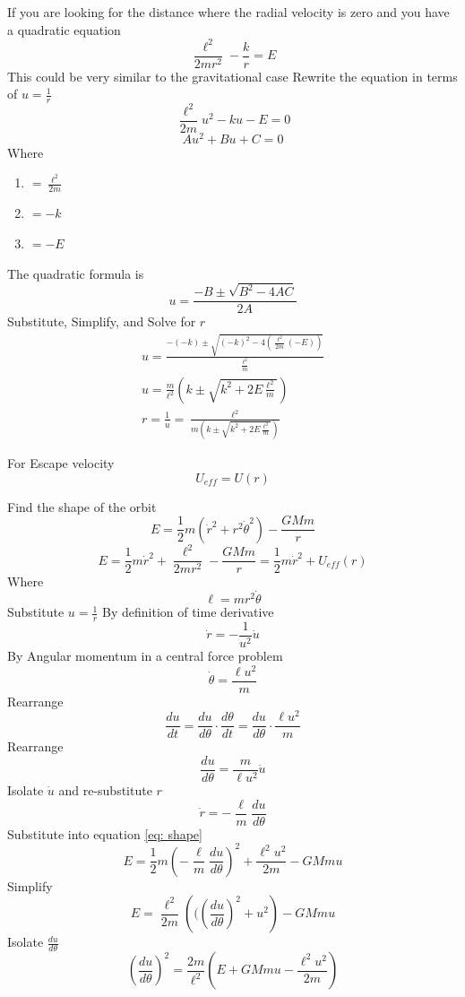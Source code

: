 \documentclass[12pt]{article}
\begin{document}
    If you are looking for the distance where the radial velocity is zero and you have a quadratic equation
    \[
        \frac{\ell^2}{2 m r^2} - \frac{k}{r} = E
    \]
    This could be very similar to the gravitational case
    Rewrite the equation in terms of $u = \frac{1}{r}$
    \[
        \frac{\ell^2}{2 m} u^2 - k u - E = 0
    \]
    \[
        Au^2 + Bu + C = 0
    \]
    Where
    \begin{enumerate}
        \item [A] $= \frac{\ell^2}{2m}$
        \item [B] $= - k$
        \item [C] $= -E$
    \end{enumerate}
    The quadratic formula is 
    \[
        u = \frac{- B \pm \sqrt{B^2 - 4 A C}}{2 A}
    \]
    Substitute, Simplify, and Solve for $r$
    \begin{gather*}
        u = \frac{- (-k) \pm \sqrt{(-k)^2 - 4 \left(\frac{\ell^2}{2 m} (-E) \right)}}{\frac{\ell^2}{m}}
        \\ u = \frac{m}{\ell^2} \left(k \pm \sqrt{k^2 + 2 E \frac{\ell^2}{m}} \right)
        \\ r = \frac{1}{u} = \frac{\ell^2}{m \left(k \pm \sqrt{k^2 + 2 E \frac{\ell^2}{m}} \right)}
    \end{gather*}

    For Escape velocity 
    \[
        U_{eff} = U(r)
    \]

    Find the shape of the orbit
    \[
        E = \frac{1}{2}m (\dot{r}^2 + r^2 \dot{\theta}^2) - \frac{G M m}{r}
    \]
    \begin{equation} \label{eq: shape}
        E = \frac{1}{2}m \dot{r}^2 + \frac{\ell^2}{2 m r^2} - \frac{G M m}{r} = \frac{1}{2}m \dot{r}^2 + U_{eff}(r)
    \end{equation}
    Where 
    \[
        \ell = m r^2 \dot{\theta}
    \]
    Substitute $u = \frac{1}{r}$
    By definition of time derivative
    \[
        \dot{r} = -\frac{1}{u^2} \dot{u}
    \]
    By Angular momentum in a central force problem
    \[
        \dot{\theta} = \frac{\ell u^2}{m}
    \]
    Rearrange
    \[
        \frac{du}{dt} = \frac{du}{d\theta} \cdot \frac{d\theta}{dt} = \frac{du}{d\theta} \cdot \frac{\ell u^2}{m}
    \]
    Rearrange
    \[
        \frac{du}{d\theta} = \frac{m}{\ell u^2} \dot{u}
    \]
    Isolate $\dot{u}$ and re-substitute $r$
    \[
        \dot{r} = -\frac{\ell}{m} \frac{du}{d\theta}
    \]
    Substitute into equation \ref{eq: shape}
    \[
        E = \frac{1}{2}m \left(-\frac{\ell}{m} \frac{du}{d\theta} \right)^2 + \frac{\ell^2 u^2}{2 m} - G M m u
    \]
    Simplify
    \[
        E = \frac{\ell^2}{2 m} \left((\left(\frac{du}{d\theta} \right)^2 + u^2 \right) - G M m u 
    \]
    Isolate $\frac{du}{d\theta}$
    \[
        \left( \frac{du}{d\theta} \right)^2 = \frac{2 m}{\ell^2} \left(E + G M m u - \frac{\ell^2 u^2}{2 m} \right)
    \]
\end{document}
